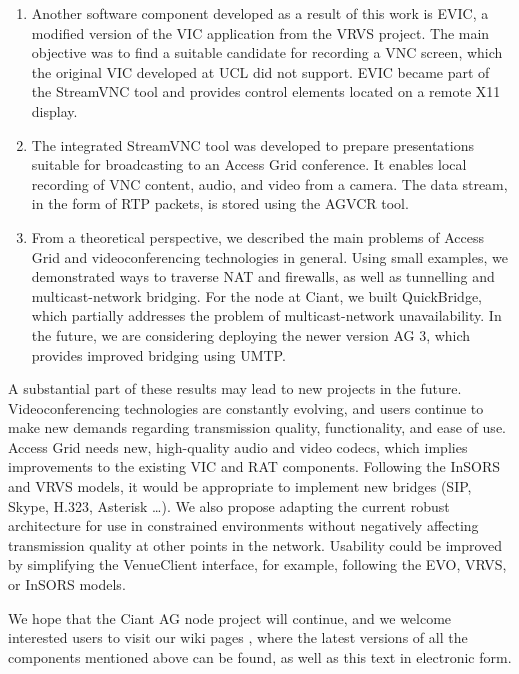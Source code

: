 \begin{enumerate}
\item Another software component developed as a result of this work is EVIC, a modified version of the VIC application from the VRVS project. The main objective was to find a suitable candidate for recording a VNC screen, which the original VIC developed at UCL did not support. EVIC became part of the StreamVNC tool and provides control elements located on a remote X11 display.

\item The integrated StreamVNC tool was developed to prepare presentations suitable for broadcasting to an Access Grid conference. It enables local recording of VNC content, audio, and video from a camera. The data stream, in the form of RTP packets, is stored using the AGVCR tool.

\item From a theoretical perspective, we described the main problems of Access Grid and videoconferencing technologies in general. Using small examples, we demonstrated ways to traverse NAT and firewalls, as well as tunnelling and multicast-network bridging. For the node at Ciant, we built QuickBridge, which partially addresses the problem of multicast-network unavailability. In the future, we are considering deploying the newer version AG 3, which provides improved bridging using UMTP.

\end{enumerate}

A substantial part of these results may lead to new projects in the future. Videoconferencing technologies are constantly evolving, and users continue to make new demands regarding transmission quality, functionality, and ease of use. Access Grid needs new, high-quality audio and video codecs, which implies improvements to the existing VIC and RAT components. Following the InSORS and VRVS models, it would be appropriate to implement new bridges (SIP, Skype, H.323, Asterisk \ldots). We also propose adapting the current robust architecture for use in constrained environments without negatively affecting transmission quality at other points in the network. Usability could be improved by simplifying the VenueClient interface, for example, following the EVO, VRVS, or InSORS models.

\medskip
We hope that the Ciant AG node project will continue, and we welcome interested users to visit our wiki pages \cite{CIANT-AGnodeWiki}, where the latest versions of all the components mentioned above can be found, as well as this text in electronic form.
\proofed
